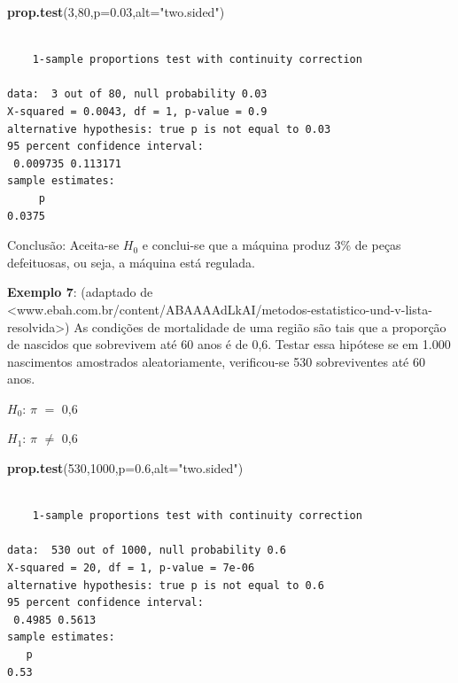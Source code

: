 \documentclass[12pt,brazil,oneside]{book}
\newenvironment{Shaded}{\begin{snugshade}}{\end{snugshade}}
\newcommand{\DataTypeTok}[1]{\textcolor[rgb]{0.13,0.29,0.53}{#1}}
\newcommand{\DecValTok}[1]{\textcolor[rgb]{0.00,0.00,0.81}{#1}}
\newcommand{\FloatTok}[1]{\textcolor[rgb]{0.00,0.00,0.81}{#1}}
\newcommand{\KeywordTok}[1]{\textcolor[rgb]{0.13,0.29,0.53}{\textbf{#1}}}
\newcommand{\NormalTok}[1]{#1}
\newcommand{\StringTok}[1]{\textcolor[rgb]{0.31,0.60,0.02}{#1}}
\begin{document}
\begin{Shaded}
\begin{Highlighting}[]
\KeywordTok{prop.test}\NormalTok{(}\DecValTok{3}\NormalTok{,}\DecValTok{80}\NormalTok{,}\DataTypeTok{p=}\FloatTok{0.03}\NormalTok{,}\DataTypeTok{alt=}\StringTok{"two.sided"}\NormalTok{)}
\end{Highlighting}
\end{Shaded}

\begin{verbatim}

    1-sample proportions test with continuity correction

data:  3 out of 80, null probability 0.03
X-squared = 0.0043, df = 1, p-value = 0.9
alternative hypothesis: true p is not equal to 0.03
95 percent confidence interval:
 0.009735 0.113171
sample estimates:
     p 
0.0375 
\end{verbatim}

Conclusão: Aceita-se \(H_0\) e conclui-se que a máquina produz 3\% de peças defeituosas, ou seja, a máquina está regulada.

\textbf{Exemplo 7}: (adaptado de \textless{}www.ebah.com.br/content/ABAAAAdLkAI/metodos-estatistico-und-v-lista-resolvida\textgreater{}) As condições de mortalidade de uma região são tais que a proporção de nascidos que sobrevivem até 60 anos é de 0,6. Testar essa hipótese se em 1.000 nascimentos amostrados aleatoriamente, verificou-se 530 sobreviventes até 60 anos.

\textbf{\(H_0\)}: \(\pi\) \(=\) 0,6

\textbf{\(H_1\)}: \(\pi\) \(\neq\) 0,6

\begin{Shaded}
\begin{Highlighting}[]
\KeywordTok{prop.test}\NormalTok{(}\DecValTok{530}\NormalTok{,}\DecValTok{1000}\NormalTok{,}\DataTypeTok{p=}\FloatTok{0.6}\NormalTok{,}\DataTypeTok{alt=}\StringTok{"two.sided"}\NormalTok{)}
\end{Highlighting}
\end{Shaded}

\begin{verbatim}

    1-sample proportions test with continuity correction

data:  530 out of 1000, null probability 0.6
X-squared = 20, df = 1, p-value = 7e-06
alternative hypothesis: true p is not equal to 0.6
95 percent confidence interval:
 0.4985 0.5613
sample estimates:
   p 
0.53 
\end{verbatim}
\end{document}
